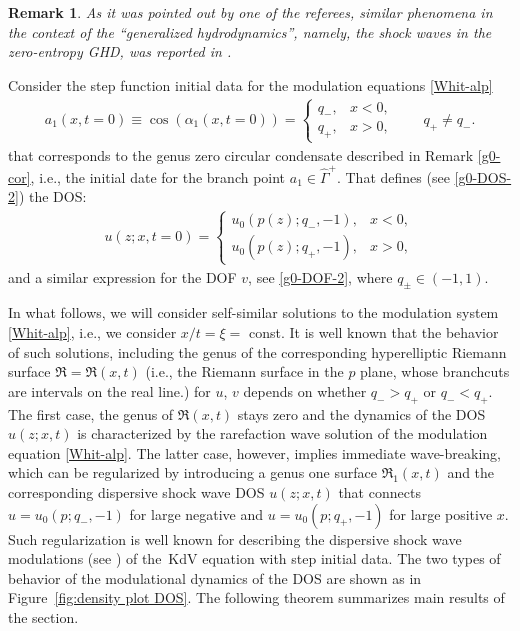 \documentclass[10pt,a4paper]{amsart}
\numberwithin{equation}{section}
\newtheorem{Remark}[Theorem]{Remark}
\newcommand{\G}{\Gamma}
\def\G{\Gamma}
\begin{document}
\begin{Remark}
As it was pointed out by one of the referees,
similar phenomena in the context of the ``generalized hydrodynamics'', namely, the shock waves in the zero-entropy GHD, was reported in {\rm \cite{DDKY2017}}.
\end{Remark}

Consider the step function initial data for the modulation equations \eqref{Whit-alp}
\begin{align}
a_1(x,t=0)\equiv \cos(\alpha_1(x,t=0))=\begin{cases}
q_-,& x<0,\\
q_+,& x>0,
\end{cases}\qquad q_+\neq q_-.\label{mod-initial-data}
\end{align}
that corresponds to the genus zero circular condensate described in Remark \ref{g0-cor}, i.e., the initial date
for the branch point $a_1\in\hat\G^+$. That defines (see \eqref{g0-DOS-2}) the DOS:{\samepage
\begin{align}
u(z;x,t=0)=\begin{cases}u_0({p(z)};q_-,-1),& x<0,\\
u_0({p(z)};q_+,-1),& x>0,\end{cases}\label{cond-Riemann-Prob}
\end{align}
and a similar expression for the DOF $v$, see \eqref{g0-DOF-2},
where $q_\pm\in(-1,1)$.}

In what follows, we will consider self-similar solutions to the modulation system \eqref{Whit-alp}, i.e., we consider $x/t=\xi=$ const. It is well known that the behavior of such solutions, including the genus of the corresponding hyperelliptic Riemann surface $\mathfrak{R}=\mathfrak{R}(x,t)$ (i.e., the Riemann surface in the $p$ plane, whose branchcuts are intervals on the real line.) for $u$, $v$
depends on whether $q_->q_+$ or $q_-<q_+$. The first case,
the genus of $ \mathfrak{R}(x,t)$ stays
zero and the dynamics of the DOS $u(z;x,t)$ is characterized by the rarefaction wave solution of
the modulation
equation \eqref{Whit-alp}. The latter case, however, implies immediate wave-breaking, which can be regularized by introducing a genus one surface $ \mathfrak{R}_1(x,t)$ and the corresponding dispersive shock wave DOS $u(z;x,t)$ that connects $u=u_0( p;q_-,-1)$ for large negative and $u=u_0( p;q_+,-1)$ for large positive $x$. Such regularization is well known for describing the dispersive shock wave modulations (see \cite{GP}) of the~KdV equation with step initial data. The two types of behavior of the modulational dynamics of the DOS are shown as in Figure~\ref{fig:density plot DOS}. The following theorem summarizes main results of the section.
\end{document}
